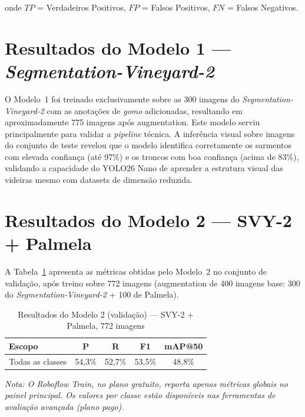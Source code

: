 \noindent onde $TP$ = Verdadeiros Positivos, $FP$ = Falsos Positivos,
$FN$ = Falsos Negativos.

\section{Resultados do Modelo 1 — \textit{Segmentation-Vineyard-2}}

O Modelo~1 foi treinado exclusivamente sobre as 300 imagens do
\textit{Segmentation-Vineyard-2} com as anotações de \textit{gomo}
adicionadas, resultando em aproximadamente 775 imagens após augmentation.
Este modelo serviu principalmente para validar a \textit{pipeline} técnica.
A inferência visual sobre imagens do conjunto de teste revelou que o modelo
identifica corretamente os sarmentos com elevada confiança (até 97\%) e os
troncos com boa confiança (acima de 83\%), validando a capacidade do
YOLO26 Nano de aprender a estrutura visual das videiras mesmo com datasets
de dimensão reduzida.

\section{Resultados do Modelo 2 — SVY-2 + Palmela}

A Tabela~\ref{tab:resultados_m2} apresenta as métricas obtidas pelo Modelo~2
no conjunto de validação, após treino sobre 772 imagens (augmentation de
400 imagens base: 300 do \textit{Segmentation-Vineyard-2} + 100 de Palmela).

\begin{table}[H]
  \centering
  \caption{Resultados do Modelo 2 (validação) — SVY-2 + Palmela, 772 imagens}
  \label{tab:resultados_m2}
  \begin{tabular}{lcccc}
    \toprule
    \textbf{Escopo}     & \textbf{P} & \textbf{R} & \textbf{F1} & \textbf{mAP@50} \\
    \midrule
    Todas as classes    & 54,3\%     & 52,7\%     & 53,5\%      & 48,8\%          \\
    \bottomrule
  \end{tabular}
\end{table}

\noindent\textit{Nota: O Roboflow Train, no plano gratuito, reporta apenas
métricas globais no painel principal. Os valores por classe estão disponíveis
nas ferramentas de avaliação avançada (plano pago).}

